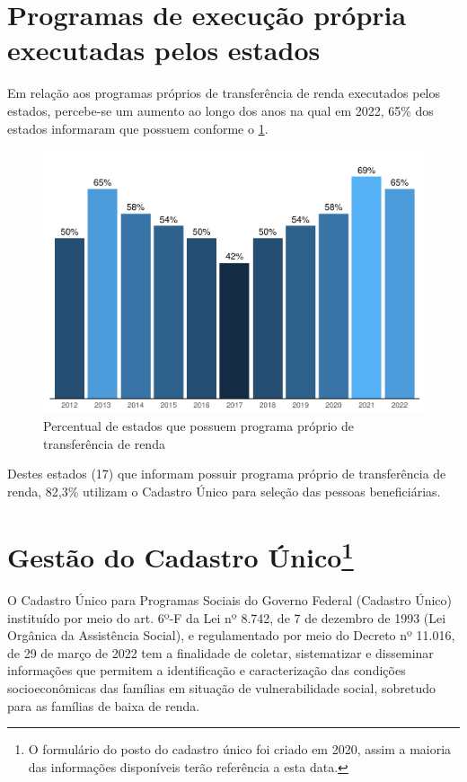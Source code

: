 \documentclass[
  brazilian]{report}
\begin{document}
\hypertarget{programas-de-execuuxe7uxe3o-pruxf3pria-executadas-pelos-estados}{%
\section{Programas de execução própria executadas pelos
estados}\label{programas-de-execuuxe7uxe3o-pruxf3pria-executadas-pelos-estados}}

Em relação aos programas próprios de transferência de renda executados
pelos estados, percebe-se um aumento ao longo dos anos na qual em 2022,
65\% dos estados informaram que possuem conforme o
\cref{fig:be_uf_renda}.

\begin{figure}
\includegraphics{Censo-SUAS-2022_files/figure-latex/be_uf_renda-1} \caption[Percentual de estados que possuem programa próprio de transferência de renda]{Percentual de estados que possuem programa próprio de transferência de renda}\label{fig:be_uf_renda}
\end{figure}

Destes estados (17) que informam possuir programa próprio de
transferência de renda, 82,3\% utilizam o Cadastro Único para seleção
das pessoas beneficiárias.

\section[Gestão do Cadastro Único]{Gestão do Cadastro Único\footnote{O formulário do posto do cadastro único foi criado em 2020, assim a maioria das informações disponíveis terão referência a esta data.}}

O Cadastro Único para Programas Sociais do Governo Federal (Cadastro
Único) instituído por meio do art. 6º-F da Lei nº 8.742, de 7 de
dezembro de 1993 (Lei Orgânica da Assistência Social), e regulamentado
por meio do Decreto nº 11.016, de 29 de março de 2022 tem a finalidade
de coletar, sistematizar e disseminar informações que permitem a
identificação e caracterização das condições socioeconômicas das
famílias em situação de vulnerabilidade social, sobretudo para as
famílias de baixa de renda.
\end{document}
